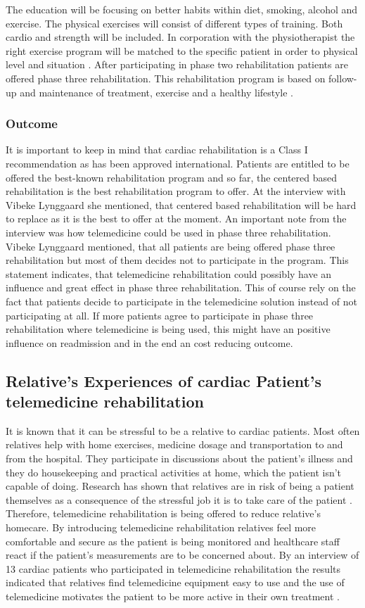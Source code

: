 The education will be focusing on better habits within diet, smoking, alcohol and exercise. The physical exercises will consist of different types of training. Both cardio and strength will be included. In corporation with the physiotherapist the right exercise program will be matched to the specific patient in order to physical level and situation \cite{herning}. After participating in phase two rehabilitation patients are offered phase three rehabilitation. This rehabilitation program is based on follow-up and maintenance of treatment, exercise and a healthy lifestyle \cite{Rehabilitering}.

\subsubsection{Outcome}  
It is important to keep in mind that cardiac rehabilitation is a Class I recommendation as has been approved international. Patients are entitled to be offered the best-known rehabilitation program and so far, the centered based rehabilitation is the best rehabilitation program to offer. At the interview with Vibeke Lynggaard she mentioned, that centered based rehabilitation will be hard to replace as it is the best to offer at the moment. An important note from the interview was how telemedicine could be used in phase three rehabilitation. Vibeke Lynggaard mentioned, that all patients are being offered phase three rehabilitation but most of them decides not to participate in the program. This statement indicates, that telemedicine rehabilitation could possibly have an influence and great effect in phase three rehabilitation. This of course rely on the fact that patients decide to participate in the telemedicine solution instead of not participating at all. If more patients agree to participate in phase three rehabilitation where telemedicine is being used, this might have an positive influence on readmission and in the end an cost reducing outcome.  


\subsection{Relative’s Experiences of cardiac Patient’s telemedicine rehabilitation}
It is known that it can be stressful to be a relative to cardiac patients. Most often relatives help with home exercises, medicine dosage and transportation to and from the hospital. They participate in discussions about the patient’s illness and they do housekeeping and practical activities at home, which the patient isn't capable of doing. Research has shown that relatives are in risk of being a patient themselves as a consequence of the stressful job it is to take care of the patient \cite{4, 5}. Therefore, telemedicine rehabilitation is being offered to reduce relative’s homecare. By introducing telemedicine rehabilitation relatives feel more comfortable and secure as the patient is being monitored and healthcare staff react if the patient’s measurements are to be concerned about. By an interview of 13 cardiac patients who participated in telemedicine rehabilitation the results indicated that relatives find telemedicine equipment easy to use and the use of telemedicine motivates the patient to be more active in their own treatment \cite{12}.  

